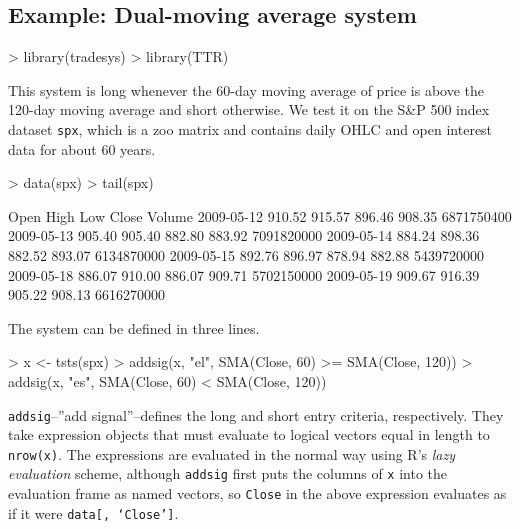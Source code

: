 \documentclass[a4]{article}
\newcommand{\code}[1]{\texttt{#1}}
\begin{document}
\subsection{Example: Dual-moving average system}
\begin{Schunk}
\begin{Sinput}
> library(tradesys)
> library(TTR)
\end{Sinput}
\end{Schunk}
This system is long whenever the 60-day moving average of price is
above the 120-day moving average and short otherwise. We test it on
the S\&P 500 index dataset \code{spx}, which is a zoo matrix and
contains daily OHLC and open interest data for about 60 years.
\begin{Schunk}
\begin{Sinput}
> data(spx)
> tail(spx)
\end{Sinput}
\begin{Soutput}
             Open   High    Low  Close     Volume
2009-05-12 910.52 915.57 896.46 908.35 6871750400
2009-05-13 905.40 905.40 882.80 883.92 7091820000
2009-05-14 884.24 898.36 882.52 893.07 6134870000
2009-05-15 892.76 896.97 878.94 882.88 5439720000
2009-05-18 886.07 910.00 886.07 909.71 5702150000
2009-05-19 909.67 916.39 905.22 908.13 6616270000
\end{Soutput}
\end{Schunk}
The system can be defined in three lines.
\begin{Schunk}
\begin{Sinput}
> x <- tsts(spx)
> addsig(x, "el", SMA(Close, 60) >= SMA(Close, 120))
> addsig(x, "es", SMA(Close, 60) < SMA(Close, 120))
\end{Sinput}
\end{Schunk}

\code{addsig}--''add signal''--defines the long and short entry
criteria, respectively. They take expression objects that must
evaluate to logical vectors equal in length to \code{nrow(x)}.  The
expressions are evaluated in the normal way using R's \emph{lazy
  evaluation} scheme, although \code{addsig} first puts the columns of
\code{x} into the evaluation frame as named vectors, so \code{Close}
in the above expression evaluates as if it were \code{data[,
    `Close']}.
\end{document}
